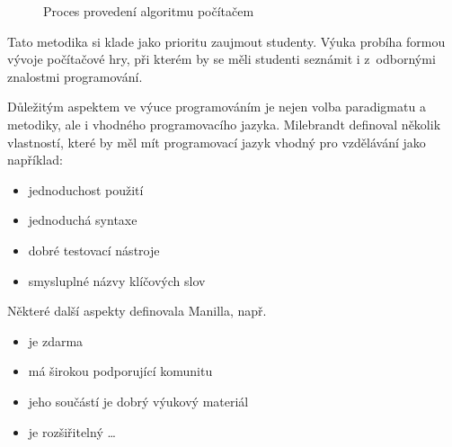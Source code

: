 \documentclass[FP,DP]{tulthesis}
\begin{document}
{{{{{{{\begin{description}
\begin{figure}[ht]
\caption{Proces provedení algoritmu počítačem \citep[s.~56]{spirit}} \label{provedeni1}
\end{figure}
\item [Game first] Tato metodika si klade jako prioritu zaujmout studenty. Výuka probíha formou vývoje počítačové hry, při kterém by se měli studenti seznámit i z~odbornými znalostmi programování.
\end{description}
Důležitým aspektem ve výuce programováním je nejen volba  paradigmatu a metodiky, ale i vhodného programovacího jazyka. Milebrandt definoval několik vlastností, které by měl mít programovací jazyk vhodný pro vzdělávání jako například:
\vspace{2mm}\begin{itemize}[nosep]
  	\item jednoduchost použití
	\item jednoduchá syntaxe
	\item dobré testovací nástroje
	\item smysluplné názvy klíčových slov
\end{itemize}
\vspace{2mm}Některé další aspekty definovala Manilla, např.
\vspace{2mm}\begin{itemize}[nosep]
  	\item je zdarma
	\item má širokou podporující komunitu
	\item jeho součástí je dobrý výukový materiál
	\item je rozšiřitelný \ldots
\end{itemize}


}}}}}}}
\end{document}
